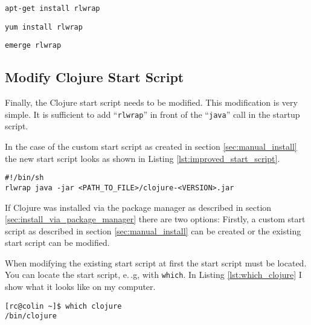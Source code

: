 \begin{lstlisting}[label=lst:rlwrap_install_debian, caption=Installation of \texttt{rlwrap} on Debian and Debian-based distributions like Ubuntu or Kubuntu]
apt-get install rlwrap
\end{lstlisting}

\begin{lstlisting}[label=lst:rlwrap_install_fedora, caption=Installation of \texttt{rlwrap} on Fedora or Red Hat]
yum install rlwrap
\end{lstlisting}

\begin{lstlisting}[label=lst:rlwrap_install_gentoo, caption=Installation of \texttt{rlwrap} on Gentoo or Funtoo]
emerge rlwrap
\end{lstlisting}

\subsection{Modify Clojure Start Script}
Finally, the Clojure start script needs to be modified.
This modification is very simple.
It is sufficient to add ``\texttt{rlwrap}'' in front of the ``\texttt{java}'' call in the startup script.

In the case of the custom start script as created in section \vref{sec:manual_install} the new start script looks as shown in Listing \vref{lst:improved_start_script}.

\begin{lstlisting}[label=lst:improved_start_script, caption=Modified Start Script with \texttt{rlwrap}]
#!/bin/sh
rlwrap java -jar <PATH_TO_FILE>/clojure-<VERSION>.jar
\end{lstlisting}

If Clojure was installed via the package manager as described in section \vref{sec:install_via_package_manager} there are two options:
Firstly, a custom start script as described in section \vref{sec:manual_install} can be created or the existing start script can be modified.

When modifying the existing start script at first the start script must be located.
You can locate the start script, e.\,.g, with \texttt{which}.
In Listing \vref{lst:which_clojure} I show what it looks like on my computer.

\begin{lstlisting}[label=lst:which_clojure, caption=Locating the Distribution Supplied Clojure Start Script]
[rc@colin ~]$ which clojure
/bin/clojure
\end{lstlisting}

